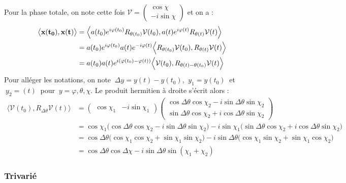 \begin{demo}
	Pour la phase totale, on note cette fois $\mathcal{V} = \begin{pmatrix} \cos\chi \\ -i\sin\chi \end{pmatrix}$ et on a :
	\begin{align*}
		\big\langle \bf{x}(t_0), \bf{x}(t)\big\rangle &= \Big\langle a(t_0)e^{i\varphi(t_0)}R_{\theta(t_0)}\mathcal{V}(t_0), a(t)e^{i\varphi(t)}R_{\theta(t)}\mathcal{V}(t) \Big\rangle \\
		&= a(t_0)e^{i\varphi(t_0)}a(t)e^{-i\varphi(t)}\Big\langle R_{\theta(t_0)}\mathcal{V}(t_0), R_{\theta(t)}\mathcal{V}(t) \Big\rangle \\
		&= a(t_0)a(t)e^{i(\varphi(t_0)-\varphi(t))}\Big\langle \mathcal{V}(t_0), R_{\theta(t)- \theta(t_0)}\mathcal{V}(t) \Big\rangle
	\end{align*}
	Pour alléger les notations, on note $\ \Delta y =y(t)-y(t_0)$, $\ y_1=y(t_0)\ $ et $\ y_2=(t)\ $ pour $\ y=\varphi,\theta,\chi$. Le produit hermitien à droite s'écrit alors :
	\begin{align*}
		\Big\langle \mathcal{V}(t_0), R_{\Delta\theta}\mathcal{V}(t) \Big\rangle &= \begin{pmatrix} \cos\chi_1 & -i\sin\chi_1 \end{pmatrix}  \begin{pmatrix} \cos\Delta\theta \cos\chi_2 - i\sin\Delta\theta \sin\chi_2 \\ \sin\Delta\theta \cos\chi_2 + i\cos\Delta\theta \sin\chi_2 \end{pmatrix} \\
		&= \cos\chi_1\Big(\cos\Delta\theta \cos\chi_2 - i\sin\Delta\theta \sin\chi_2\Big) - i\sin\chi_1\Big(\sin\Delta\theta \cos\chi_2 + i\cos\Delta\theta \sin\chi_2\Big) \\
		&= \cos\Delta\theta \Big(\cos\chi_1 \cos\chi_2 + \sin\chi_1 \sin\chi_2\Big) - i\sin\Delta\theta \Big( \cos\chi_1 \sin\chi_2 + \sin\chi_1\cos\chi_2\Big) \\
		&= \cos\Delta\theta \cos\Delta\chi - i\sin\Delta\theta \sin(\chi_1+\chi_2)
	\end{align*}
\end{demo}




\subsubsection{Trivarié}

